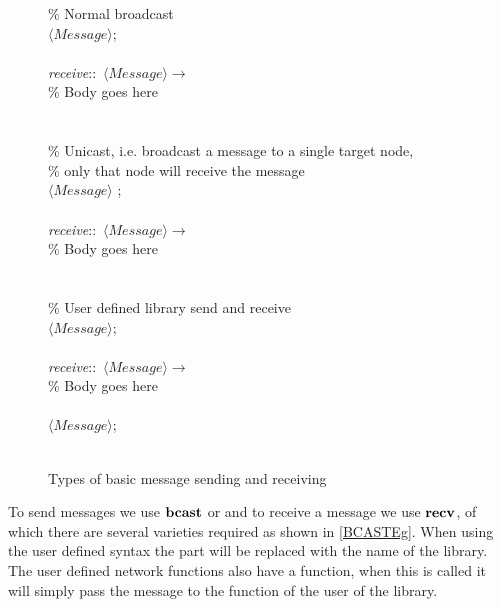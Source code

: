 \begin{figure}[H]
  \centering
  \begin{boxedminipage}{\linewidth}
    \null\qq \% Normal broadcast \\
    \null\qq {}$\langle Message\rangle$;\\~\\
    \null\qq \emph{receive}::~$\langle Message\rangle \rightarrow$\\
    \null\qq\qq \% Body goes here\\~\\~\\
    \null\qq \% Unicast, i.e. broadcast a message to a single target node,\\
    \null\qq \% only that node will receive the message \\
    \null\qq {}$\langle Message\rangle$  ;\\~\\
    \null\qq \emph{receive}::~$\langle Message\rangle \rightarrow$\\
    \null\qq\qq \% Body goes here\\~\\~\\
    \null\qq \% User defined library send and receive \\
    \null\qq {}$\langle Message\rangle$;\\~\\
    \null\qq \emph{receive}::~$\langle Message\rangle \rightarrow$\\
    \null\qq\qq \% Body goes here\\~\\
    \null\qq {}$\langle Message\rangle$;\\~\\
  \end{boxedminipage}
  \caption{Types of basic message sending and receiving}
  \label{BCASTEg}
\end{figure}

To send messages we use $\mbox{\textbf{bcast}}$ or  and to receive a message we use $\mbox{\textbf{recv}}$, of which there are several varieties required as shown in \autoref{BCASTEg}. When using the user defined syntax the  part will be replaced with the name of the library. The user defined network functions also have a  function, when this is called it will simply pass the message to the  function of the user of the library. 

